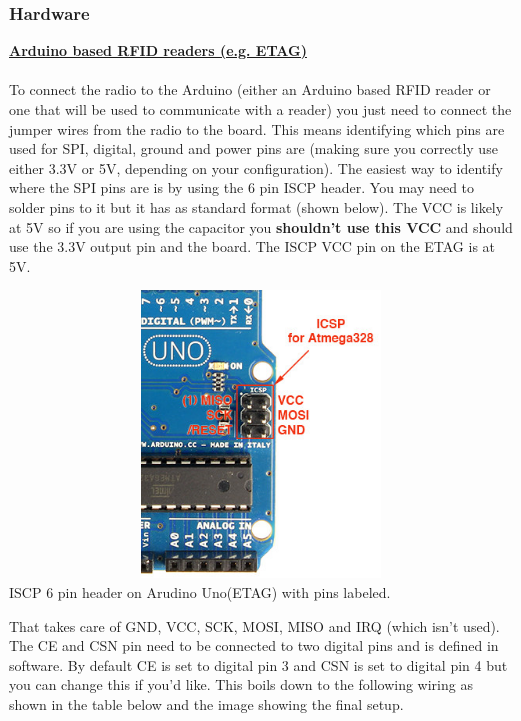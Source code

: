 \documentclass[12pt]{article}
\begin{document}
\subsubsection{Hardware}
\underline{\textbf{Arduino based RFID readers (e.g. ETAG)}}\\\\
To connect the radio to the Arduino (either an Arduino based RFID reader or one that will be used to communicate with a reader) you just need to connect the jumper wires from the radio to the board.  This means identifying which pins are used for SPI, digital, ground and power pins are (making sure you correctly use either 3.3V or 5V, depending on your configuration).
The easiest way to identify where the SPI pins are is by using the 6 pin ISCP header.  You may need to solder pins to it but it has as standard format (shown below).  The VCC is likely at 5V so if you are using the capacitor you \textbf{shouldn't use this VCC} and should use the 3.3V output pin and the board.  The ISCP VCC pin on the ETAG is at 5V.\\
\begin{center}
	\includegraphics[width=6in,height=3in,keepaspectratio]{icsp_pinout}\\
	ISCP 6 pin header on Arudino Uno(ETAG) with pins labeled.
\end{center}
That takes care of GND, VCC, SCK, MOSI, MISO and IRQ (which isn't used).  The CE and CSN pin need to be connected to two digital pins and is defined in software.  By default CE is set to digital pin 3 and CSN is set to digital pin 4 but you can change this if you'd like.  This boils down to the following wiring as shown in the table below and the image showing the final setup.\\
\end{document}
